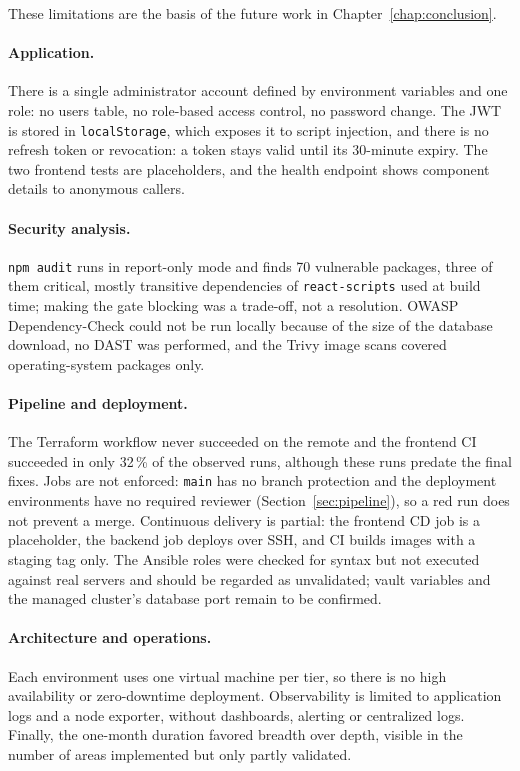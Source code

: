 These limitations are the basis of the future work in Chapter~\ref{chap:conclusion}.

\paragraph{Application.} There is a single administrator account defined by environment variables and one role: no users table, no role-based access control, no password change. The JWT is stored in \texttt{localStorage}, which exposes it to script injection, and there is no refresh token or revocation: a token stays valid until its 30-minute expiry. The two frontend tests are placeholders, and the health endpoint shows component details to anonymous callers.

\paragraph{Security analysis.} \texttt{npm audit} runs in report-only mode and finds 70 vulnerable packages, three of them critical, mostly transitive dependencies of \texttt{react-scripts} used at build time; making the gate blocking was a trade-off, not a resolution. OWASP Dependency-Check could not be run locally because of the size of the database download, no DAST was performed, and the Trivy image scans covered operating-system packages only.

\paragraph{Pipeline and deployment.} The Terraform workflow never succeeded on the remote and the frontend CI succeeded in only 32\,\% of the observed runs, although these runs predate the final fixes. Jobs are not enforced: \texttt{main} has no branch protection and the deployment environments have no required reviewer (Section~\ref{sec:pipeline}), so a red run does not prevent a merge. Continuous delivery is partial: the frontend CD job is a placeholder, the backend job deploys over SSH, and CI builds images with a staging tag only. The Ansible roles were checked for syntax but not executed against real servers and should be regarded as unvalidated; vault variables and the managed cluster's database port remain to be confirmed.

\paragraph{Architecture and operations.} Each environment uses one virtual machine per tier, so there is no high availability or zero-downtime deployment. Observability is limited to application logs and a node exporter, without dashboards, alerting or centralized logs. Finally, the one-month duration favored breadth over depth, visible in the number of areas implemented but only partly validated.


